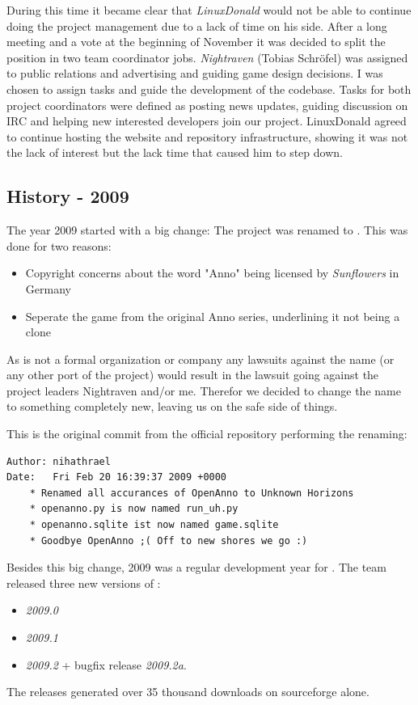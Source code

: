 During this time it became clear that \textit{LinuxDonald} would not be able to continue doing the project management
due to a lack of time on his side. After a long meeting and a vote at the beginning of November it was decided to split the
position in two team coordinator jobs. \textit{Nightraven} (Tobias Schröfel) was assigned to public relations and
advertising and guiding game design decisions. I was chosen to assign tasks and guide the development of the codebase.
Tasks for both project coordinators were defined as posting news updates, guiding discussion on IRC and helping new
interested developers join our project. LinuxDonald agreed to continue hosting the website and repository
infrastructure, showing it was not the lack of interest but the lack time that caused him to step down.

\subsection{History - 2009}
The year 2009 started with a big change: The project was renamed to \UH{}. This was done for two reasons:
\begin{itemize}
    \item Copyright concerns about the word "Anno" being licensed by \textit{Sunflowers} in Germany
    \item Seperate the game from the original Anno series, underlining it not being a clone
\end{itemize}

As \UH{} is not a formal organization or company any lawsuits against the name (or any other port of the project) would
result in the lawsuit going against the project leaders Nightraven and/or me. Therefor we decided to change the name to
something completely new, leaving us on the safe side of things.

This is the original commit from the official repository performing the renaming:
\begin{lstlisting}[caption=Commit 1831 renaming OpenAnno to Unknown Horizons, label=renamecommit]
Author: nihathrael
Date:   Fri Feb 20 16:39:37 2009 +0000
    * Renamed all accurances of OpenAnno to Unknown Horizons
    * openanno.py is now named run_uh.py
    * openanno.sqlite ist now named game.sqlite
    * Goodbye OpenAnno ;( Off to new shores we go :)
\end{lstlisting}

Besides this big change, 2009 was a regular development year for \UH{}. The team released three new versions of \UH{}:
\begin{itemize}
\item \textit{2009.0}
\item \textit{2009.1}
\item \textit{2009.2} + bugfix release \textit{2009.2a}. 
\end{itemize}
The releases generated over 35 thousand downloads on sourceforge alone.

